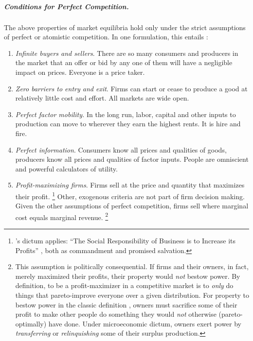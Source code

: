 \subparagraph[Perfect Competition]{Conditions for Perfect Competition.} \label{sec:perfect-competition}
The above properties of market equilibria hold only under the strict assumptions of perfect or atomistic competition.
In one formulation, this entails \citep[157f.]{McDowell2006}:
\begin{enumerate}
	\item \emph{Infinite buyers and sellers}.
\label{itm:infinite-buyers-sellers}
		There are so many consumers and producers in the market that an offer or bid by any one of them will have a negligible impact on prices.
		Everyone is a price taker.
	\item \emph{Zero barriers to entry and exit}.
\label{itm:easy-entry-exit}
	 	Firms can start or cease to produce a good at relatively little cost and effort.
	 	All markets are wide open.
	\item \emph{Perfect factor mobility.} \label{itm:perfect-factor-mobility}
		In the long run, labor, capital and other inputs to production can move to wherever they earn the highest rents.
		It is hire and fire.
	\item \emph{Perfect information}.
\label{itm:perfect-information}
		Consumers know all prices and qualities of goods, producers know all prices and qualities of factor inputs.
		People are omniscient and powerful calculators of utility.
	\item \emph{Profit-maximizing firms}.
\label{itm:profit-maximizing-firms}
		Firms sell at the price and quantity that maximizes their profit.
		\footnote{
			\citeauthor{Friedman1970a}'s dictum applies:
			``The Social Responsibility of Business is to Increase its Profits'' \citeyearpar{Friedman1970a}, both as commandment and promised salvation.
		}
		Other, exogenous criteria are not part of firm decision making.
Given the other assumptions of perfect competition, firms sell where marginal cost equals marginal revenue.
		\footnote{
			This assumption is politically consequential.
			If firms and their owners, in fact, merely maximized their profits, their property would \emph{not} bestow power.
			By definition, to be a profit-maximizer in a competitive market is to \emph{only} do things that pareto-improve everyone over a given distribution.
			For property to bestow power in the classic definition \citep[8ff]{Geoff2002}, owners must sacrifice some of their profit to make other people do something they would \emph{not} otherwise (pareto-optimally) have done.
			Under microeconomic dictum, owners exert power by \emph{transferring} or \emph{relinquishing} some of their surplus production.

}
\end{enumerate}
